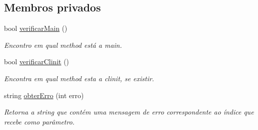 \subsection*{Membros privados}
\begin{DoxyCompactItemize}
\item 
bool \hyperlink{classClassFile_ae8e4445e763c4ee7c04995fcea0369e0}{verificar\+Main} ()
\begin{DoxyCompactList}\small\item\em Encontro em qual method está a main. \end{DoxyCompactList}\item 
bool \hyperlink{classClassFile_ab0394185a299f35a9b5be68143385e84}{verificar\+Clinit} ()
\begin{DoxyCompactList}\small\item\em Encontra em qual method esta a clinit, se existir. \end{DoxyCompactList}\item 
string \hyperlink{classClassFile_a32767b8d966ef87249aa3a41ec5d67c3}{obter\+Erro} (int erro)
\begin{DoxyCompactList}\small\item\em Retorna a string que contém uma mensagem de erro correspondente ao índice que recebe como parâmetro. \end{DoxyCompactList}\end{DoxyCompactItemize}
